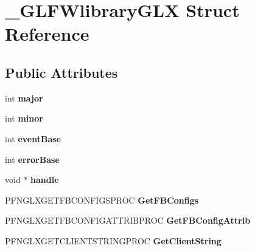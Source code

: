 \hypertarget{struct__GLFWlibraryGLX}{}\section{\+\_\+\+G\+L\+F\+Wlibrary\+G\+L\+X Struct Reference}
\label{struct__GLFWlibraryGLX}
\subsection*{Public Attributes}
\begin{DoxyCompactItemize}
\item 
\hypertarget{struct__GLFWlibraryGLX_a5ebc24b132dc44db8f3a7903d3b08d2f}{}int {\bfseries major}\label{struct__GLFWlibraryGLX_a5ebc24b132dc44db8f3a7903d3b08d2f}

\item 
\hypertarget{struct__GLFWlibraryGLX_aa4a92312a525ea9c9fed4f6a9b2fd107}{}int {\bfseries minor}\label{struct__GLFWlibraryGLX_aa4a92312a525ea9c9fed4f6a9b2fd107}

\item 
\hypertarget{struct__GLFWlibraryGLX_ac9a5cdb01c0772fe80f3ec0e22762b2b}{}int {\bfseries event\+Base}\label{struct__GLFWlibraryGLX_ac9a5cdb01c0772fe80f3ec0e22762b2b}

\item 
\hypertarget{struct__GLFWlibraryGLX_af6bff15fce849071ccc3072386bf6046}{}int {\bfseries error\+Base}\label{struct__GLFWlibraryGLX_af6bff15fce849071ccc3072386bf6046}

\item 
\hypertarget{struct__GLFWlibraryGLX_ac9439f775784fd6066220b50764b172d}{}void $\ast$ {\bfseries handle}\label{struct__GLFWlibraryGLX_ac9439f775784fd6066220b50764b172d}

\item 
\hypertarget{struct__GLFWlibraryGLX_a066312da8ebb3286c9a95b658362be55}{}P\+F\+N\+G\+L\+X\+G\+E\+T\+F\+B\+C\+O\+N\+F\+I\+G\+S\+P\+R\+O\+C {\bfseries Get\+F\+B\+Configs}\label{struct__GLFWlibraryGLX_a066312da8ebb3286c9a95b658362be55}

\item 
\hypertarget{struct__GLFWlibraryGLX_a516e2b34242d57e7f8ef4d3a9ed9025d}{}P\+F\+N\+G\+L\+X\+G\+E\+T\+F\+B\+C\+O\+N\+F\+I\+G\+A\+T\+T\+R\+I\+B\+P\+R\+O\+C {\bfseries Get\+F\+B\+Config\+Attrib}\label{struct__GLFWlibraryGLX_a516e2b34242d57e7f8ef4d3a9ed9025d}

\item 
\hypertarget{struct__GLFWlibraryGLX_ad8603abc23fbdfb9abe0ccb0a34f78b3}{}P\+F\+N\+G\+L\+X\+G\+E\+T\+C\+L\+I\+E\+N\+T\+S\+T\+R\+I\+N\+G\+P\+R\+O\+C {\bfseries Get\+Client\+String}\label{struct__GLFWlibraryGLX_ad8603abc23fbdfb9abe0ccb0a34f78b3}


\end{DoxyCompactItemize}
